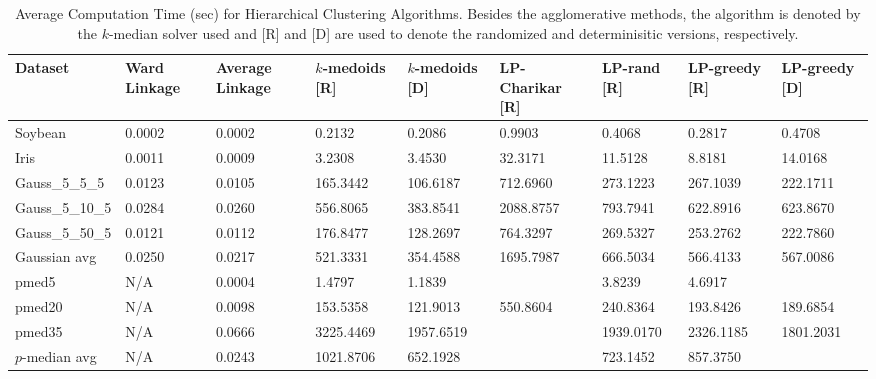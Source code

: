 \documentclass[conference, 10pt, final]{IEEEtran}
\begin{document}
\begin{table}[!t]
\label{fig:hier_results_comp}
\caption{Average Computation Time (sec) for Hierarchical Clustering Algorithms. Besides the agglomerative methods, the algorithm is denoted by the $k$-median solver used and [R] and [D] are used to denote the randomized and determinisitic versions, respectively.}
\centering
\begin{tabular}{ | l | l | l | l | l | l | l | l| l| }
\hline
Dataset	&	Ward Linkage	&	Average Linkage	&	$k$-medoids [R]	&	$k$-medoids [D]	&	LP-Charikar [R]	&	LP-rand [R]	&	LP-greedy [R]	&	LP-greedy [D]	\\ \hline
Soybean	&	0.0002	&	0.0002	&	0.2132	&	0.2086	&	0.9903	&	0.4068	&	0.2817	&	0.4708	\\
Iris	&	0.0011	&	0.0009	&	3.2308	&	3.4530	&	32.3171	&	11.5128	&	8.8181	&	14.0168	\\
Gauss\_5\_5\_5	&	0.0123	&	0.0105	&	165.3442	&	106.6187	&	712.6960	&	273.1223	&	267.1039	&	222.1711	\\
Gauss\_5\_10\_5	&	0.0284	&	0.0260	&	556.8065	&	383.8541	&	2088.8757	&	793.7941	&	622.8916	&	623.8670	\\
Gauss\_5\_50\_5	&	0.0121	&	0.0112	&	176.8477	&	128.2697	&	764.3297	&	269.5327	&	253.2762	&	222.7860	\\
Gaussian avg	&	0.0250	&	0.0217	&	521.3331	&	354.4588	&	1695.7987	&	666.5034	&	566.4133	&	567.0086	\\
pmed5	&	N/A	&	0.0004	&	1.4797	&	1.1839	&		&	3.8239	&	4.6917	&		\\
pmed20	&	N/A	&	0.0098	&	153.5358	&	121.9013	&	550.8604	&	240.8364	&	193.8426	&	189.6854	\\
pmed35	&	N/A	&	0.0666	&	3225.4469	&	1957.6519	&		&	1939.0170	&	2326.1185	&	1801.2031	\\
$p$-median avg	&	N/A	&	0.0243	&	1021.8706	&	652.1928	&		&	723.1452	&	857.3750	&		\\ \hline
\end{tabular}
\end{table}
\end{document}
